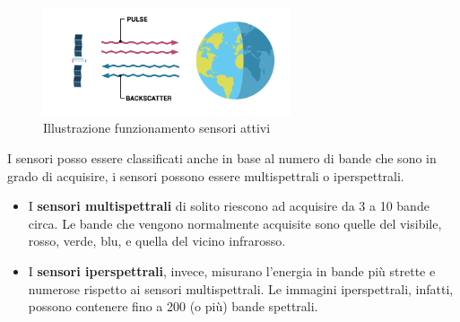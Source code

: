 \begin{itemize}
    \begin{figure}[H]
        \centering
        \includegraphics[width=0.65\textwidth]{Immagini/Generiche/Active-Remote-Sensing.png}
        \caption{Illustrazione funzionamento sensori attivi \cite{GISGeography_RemoteSensing}}
    \end{figure}

\end{itemize}

I sensori posso essere classificati anche in base al numero di bande che sono in grado di acquisire, i sensori possono essere 
multispettrali o iperspettrali. 

\begin{itemize}
    \item I \textbf{sensori multispettrali} di solito riescono ad acquisire 
    da 3 a 10 bande circa. Le bande che vengono normalmente acquisite sono quelle 
    del visibile, rosso, verde, blu, e quella del vicino infrarosso.

    \item I \textbf{sensori iperspettrali}, invece, misurano l'energia in bande più strette e numerose rispetto ai sensori 
    multispettrali. Le immagini iperspettrali, infatti, possono contenere fino a 200 (o 
    più) bande spettrali. 
\end{itemize}